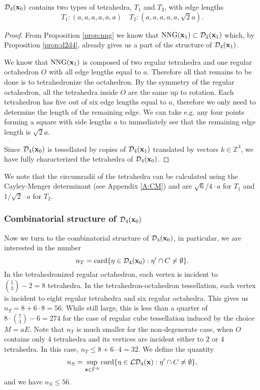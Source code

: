 \begin{proposition}\label{prop:tetraInTess} $\mathcal D_4({\mathbf{x}}_0)$ contains two types of tetrahedra, $T_1$ and $T_2$, with edge lengths
	$$T_1:(a,a,a,a,a,a) \quad T_2:(a,a,a,a,a,\sqrt 2a). $$
\end{proposition}
\begin{proof}
	From Proposition \ref{prop:nng} we know that $\mathrm{NNG}({\mathbf{x}}_1) \subset \mathcal D_2({\mathbf{x}}_1)$ which, by Proposition \ref{prop:d2d4}, already gives us a part of the structure of $\mathcal D_4({\mathbf{x}}_1)$. 

We know that $\text{NNG}({\mathbf{x}}_1)$ is composed of two regular tetrahedra and one regular octahedron $O$ with all edge lengths equal to $a$. Therefore all that remains to be done is to tetrahedronize the octahedron. By the symmetry of the regular octahedron, all the tetrahedra inside $O$ are the same up to rotation. Each tetrahedron has five out of six edge lengths equal to $a$, therefore we only need to determine the length of the remaining edge. We can take e.g. any four points forming a square with side lengths $a$ to immediately see that the remaining edge length is $\sqrt 2a$.

Since $\mathcal D_4({\mathbf{x}}_0)$ is tessellated by copies of $\mathcal D_4({\mathbf{x}}_1)$ translated by vectors $k\in\mathbb Z^3$, we have fully characterized the tetrahedra of $\mathcal D_4({\mathbf{x}}_0)$. 
\end{proof}

We note that the circumradii of the tetrahedra can be calculated using the Cayley-Menger determinant (see Appendix \ref{A:CM}) and are $\sqrt{6}/4 \cdot a$ for $T_1$ and $1/\sqrt{2}\cdot a$ for $T_2$.

\subsubsection{Combinatorial structure of $\mathcal D_4({\mathbf{x}}_0)$}\label{sec:combinatorial}

Now we turn to the combinatorial structure of $\mathcal D_4({\mathbf{x}}_0)$, in particular, we are interested in the number
$$n_T = \mathrm{card}\{\eta \in \mathcal D_4({\mathbf{x}}_0): \eta' \cap C \neq \emptyset \}.$$
In the tetrahedronized regular octahedron, each vertex is incident to $\binom{5}{3}-2=8$ tetrahedra. In the tetrahedron-octahedron tessellation, each  vertex is incident to eight regular tetrahedra and six regular octahedra. This gives us $n_T = 8 + 6\cdot 8 = 56$. While still large, this is less than a quarter of $8\cdot \binom{7}{3}-6 = 274$ for the case of regular cube tessellation induced by the choice $M=aE$. Note that $n_T$ is much smaller for the non-degenerate case, when $O$ contains only $4$ tetrahedra and its vertices are incident either to $2$ or $4$ tetrahedra. In this case, $n_T\leq 8+6\cdot 4 = 32$. We define the quantity
$$n_S = \sup_{{\mathbf{x}} \in \bar\Gamma^A} \mathrm{card}\{\eta \in \mathcal {LD}_4({\mathbf{x}}): \eta' \cap C \neq \emptyset \},$$
and we have $n_S \leq 56$.

